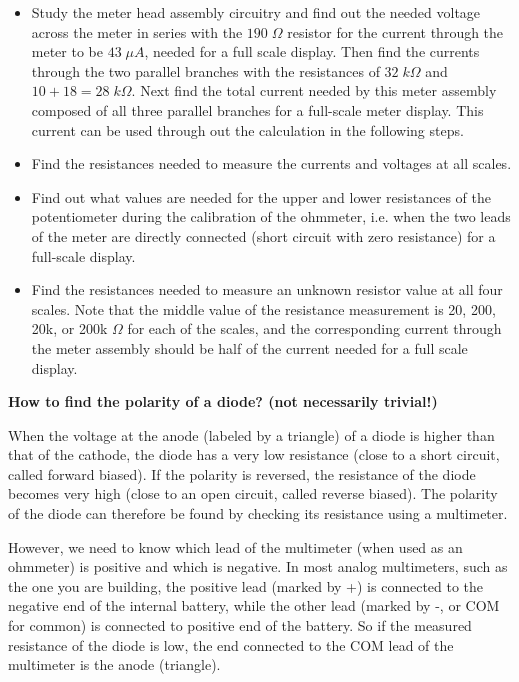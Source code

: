 \begin{itemize}
\item Study the meter head assembly circuitry and find out the needed voltage 
  across the meter in series with the $190\; \Omega$ resistor for the current 
  through the meter to be $43 \;\mu A$, needed for a full scale display. Then 
  find the currents through the two parallel branches with the resistances of 
  $32\; k\Omega$ and $10+18=28\;k\Omega$. Next find the total current needed 
  by this meter assembly composed of all three parallel branches for a 
  full-scale meter display. This current can be used through out the calculation 
  in the following steps.

\item Find the resistances needed to measure the currents and voltages at all
  scales.

\item Find out what values are needed for the upper and lower resistances of the 
  potentiometer during the calibration of the ohmmeter, i.e. when the two leads
  of the meter are directly connected (short circuit with zero resistance) for a 
  full-scale display.

\item Find the resistances needed to measure an unknown resistor value at all
  four scales. Note that the middle value of the resistance measurement is 20, 
  200, 20k, or 200k $\Omega$ for each of the scales, and the corresponding 
  current through the meter assembly should be half of the current needed for 
  a full scale display.

\end{itemize}




{\bf How to find the polarity of a diode? (not necessarily trivial!)}

When the voltage at the anode (labeled by a triangle) of a diode is higher
than that of the cathode, the diode has a very low resistance (close to a short
circuit, called forward biased). If the polarity is reversed, the resistance 
of the diode becomes very high (close to an open circuit, called reverse biased).
The polarity of the diode can therefore be found by checking its resistance 
using a multimeter.

However, we need to know which lead of the multimeter (when used as an ohmmeter) 
is positive and which is negative. In most analog multimeters, such as the one 
you are building, the positive lead (marked by +) is connected to the negative 
end of the internal battery, while the other lead (marked by -, or COM for common)
is connected to positive end of the battery. So if the measured resistance of the 
diode is low, the end connected to the COM lead of the multimeter is the anode
(triangle).

